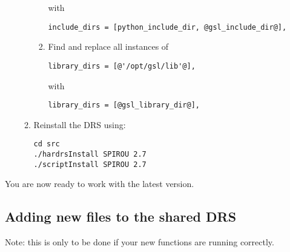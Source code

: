 \begin{enumerate}
\begin{enumerate}
\begin{enumerate}
with
\begin{lstlisting}[style=text]
include_dirs = [python_include_dir, @gsl_include_dir@],
\end{lstlisting}

\item Find and replace all instances of 
\begin{lstlisting}[style=text]
library_dirs = [@'/opt/gsl/lib'@],  
\end{lstlisting}

with
\begin{lstlisting}[style=text]
library_dirs = [@gsl_library_dir@],
\end{lstlisting}

\end{enumerate}


\item Reinstall the DRS using:
\begin{lstlisting}[style=bashstyle]
cd src
./hardrsInstall SPIROU 2.7
./scriptInstall SPIROU 2.7
\end{lstlisting}

\end{enumerate}


\end{enumerate}

You are now ready to work with the latest version.


\subsection{Adding new files to the shared DRS}
\label{section:how_to_add}

Note: this is only to be done if your new functions are running correctly.

